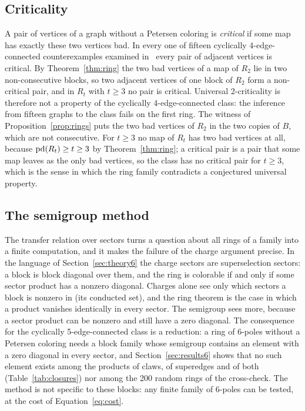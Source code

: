 \subsection{Criticality}\label{sec:criticality}

A pair of vertices of a graph without a Petersen coloring is \emph{critical}
if some map has exactly these two vertices bad. In every one of fifteen cyclically
4-edge-connected counterexamples examined in~\cite{Audit2026} every pair of adjacent vertices is
critical. By Theorem~\ref{thm:ring} the two bad vertices of a map of $R_2$ lie in two
non-consecutive blocks, so two adjacent vertices of one block of $R_2$ form a non-critical pair,
and in $R_t$ with $t \ge 3$ no pair is critical. Universal 2-criticality is therefore not a
property of the cyclically 4-edge-connected class: the inference from fifteen graphs to the class fails on the first
ring. The witness of Proposition~\ref{prop:rings} puts the two bad vertices of $R_2$ in the two copies of $B$, which are not consecutive. For $t \ge 3$ no map of $R_t$ has two bad vertices at all,
because $\mathrm{pd}(R_t) \ge t \ge 3$ by Theorem~\ref{thm:ring}; a critical pair is a pair that some map leaves as the only bad vertices, so the class has no critical pair for $t \ge 3$, which is the
sense in which the ring family contradicts a conjectured universal property.

\subsection{The semigroup method}\label{sec:semigroup}

The transfer relation over sectors turns a question about all rings of a family into a finite computation, and it makes the failure of the charge argument precise.
In the language of Section~\ref{sec:theory6} the charge sectors are superselection sectors: a block is block diagonal over them, and the ring is colorable if and only if
some sector product has a nonzero diagonal. Charges alone see only which sectors a block is nonzero in (its conducted set), and the ring theorem is the case in which
a product vanishes identically in every sector. The semigroup sees more, because a sector product can be nonzero and still have a zero diagonal. The consequence for
the cyclically 5-edge-connected class is a reduction: a ring of 6-poles without a Petersen coloring needs a block family whose semigroup
contains an element with a zero diagonal in every sector, and Section~\ref{sec:results6} shows that no such element exists among the products of claws, of superedges and of both
(Table~\ref{tab:closures}) nor among the 200 random rings of the cross-check. The method is not specific to these blocks: any finite family of 6-poles can be tested, at the cost of
Equation~\eqref{eq:cost}.

